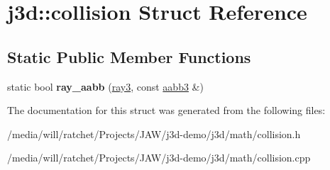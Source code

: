 \hypertarget{structj3d_1_1collision}{}\section{j3d\+:\+:collision Struct Reference}
\label{structj3d_1_1collision}
\subsection*{Static Public Member Functions}
\begin{DoxyCompactItemize}
\item 
\hypertarget{structj3d_1_1collision_a61a325d2a43ed604b4e95f9b063be6e0}{}static bool {\bfseries ray\+\_\+aabb} (\hyperlink{structj3d_1_1ray3}{ray3}, const \hyperlink{structj3d_1_1aabb}{aabb3} \&)\label{structj3d_1_1collision_a61a325d2a43ed604b4e95f9b063be6e0}

\end{DoxyCompactItemize}


The documentation for this struct was generated from the following files\+:\begin{DoxyCompactItemize}
\item 
/media/will/ratchet/\+Projects/\+J\+A\+W/j3d-\/demo/j3d/math/collision.\+h\item 
/media/will/ratchet/\+Projects/\+J\+A\+W/j3d-\/demo/j3d/math/collision.\+cpp\end{DoxyCompactItemize}
